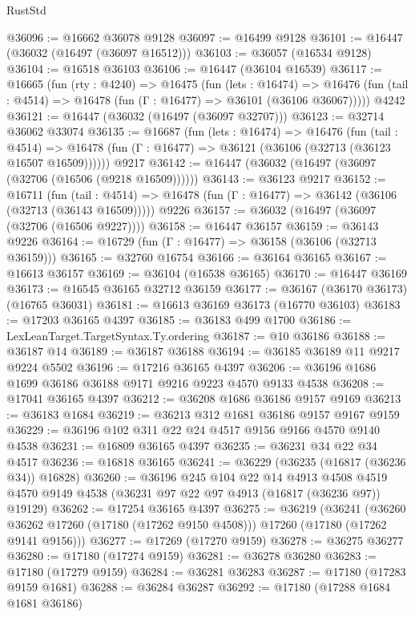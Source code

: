 \begin{lexlean}{RustStd}
\begin{coremodule}
@36096 := @16662 @36078 @9128
@36097 := @16499 @9128
@36101 := @16447 (@36032 (@16497 (@36097 @16512)))
@36103 := @36057 (@16534 @9128)
@36104 := @16518 @36103
@36106 := @16447 (@36104 @16539)
@36117 := @16665
    (fun (rty : @4240) =>
    @16475
      (fun (lets : @16474) =>
      @16476 (fun (tail : @4514) => @16478 (fun (Γ : @16477) => @36101 (@36106 @36067)))))
    @4242
@36121 := @16447 (@36032 (@16497 (@36097 @32707)))
@36123 := @32714 @36062 @33074
@36135 := @16687
    (fun (lets : @16474) =>
    @16476
      (fun (tail : @4514) =>
      @16478 (fun (Γ : @16477) => @36121 (@36106 (@32713 (@36123 @16507 @16509))))))
    @9217
@36142 := @16447 (@36032 (@16497 (@36097 (@32706 (@16506 (@9218 @16509))))))
@36143 := @36123 @9217
@36152 := @16711
    (fun (tail : @4514) => @16478 (fun (Γ : @16477) => @36142 (@36106 (@32713 (@36143 @16509)))))
    @9226
@36157 := @36032 (@16497 (@36097 (@32706 (@16506 @9227))))
@36158 := @16447 @36157
@36159 := @36143 @9226
@36164 := @16729 (fun (Γ : @16477) => @36158 (@36106 (@32713 @36159)))
@36165 := @32760 @16754
@36166 := @36164 @36165
@36167 := @16613 @36157
@36169 := @36104 (@16538 @36165)
@36170 := @16447 @36169
@36173 := @16545 @36165 @32712 @36159
@36177 := @36167 (@36170 @36173) (@16765 @36031)
@36181 := @16613 @36169 @36173 (@16770 @36103)
@36183 := @17203 @36165 @4397
@36185 := @36183 @499 @1700
@36186 := LexLeanTarget.TargetSyntax.Ty.ordering
@36187 := @10 @36186
@36188 := @36187 @14
@36189 := @36187 @36188
@36194 := @36185 @36189 @11 @9217 @9224 @5502
@36196 := @17216 @36165 @4397
@36206 := @36196 @1686 @1699 @36186 @36188 @9171 @9216 @9223 @4570 @9133 @4538
@36208 := @17041 @36165 @4397
@36212 := @36208 @1686 @36186 @9157 @9169
@36213 := @36183 @1684
@36219 := @36213 @312 @1681 @36186 @9157 @9167 @9159
@36229 := @36196 @102 @311 @22 @24 @4517 @9156 @9166 @4570 @9140 @4538
@36231 := @16809 @36165 @4397
@36235 := @36231 @34 @22 @34 @4517
@36236 := @16818 @36165
@36241 := @36229 (@36235 (@16817 (@36236 @34)) @16828)
@36260 := @36196
    @245
    @104
    @22
    @14
    @4913
    @4508
    @4519
    @4570
    @9149
    @4538
    (@36231 @97 @22 @97 @4913 (@16817 (@36236 @97)) @19129)
@36262 := @17254 @36165 @4397
@36275 := @36219
    (@36241
      (@36260 @36262 @17260 (@17180 (@17262 @9150 @4508)))
      @17260
      (@17180 (@17262 @9141 @9156)))
@36277 := @17269 (@17270 @9159)
@36278 := @36275 @36277
@36280 := @17180 (@17274 @9159)
@36281 := @36278 @36280
@36283 := @17180 (@17279 @9159)
@36284 := @36281 @36283
@36287 := @17180 (@17283 @9159 @1681)
@36288 := @36284 @36287
@36292 := @17180 (@17288 @1684 @1681 @36186)

\end{coremodule}
\end{lexlean}
